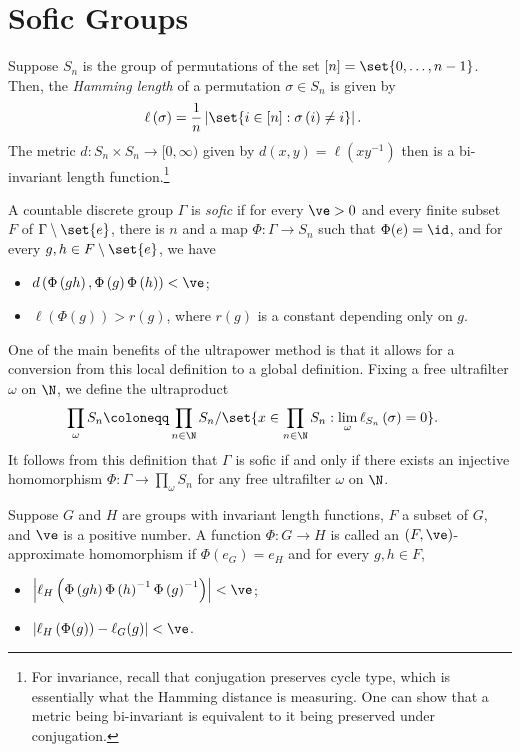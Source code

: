 \documentclass[10pt]{mypackage}
\renewcommand{\coloneq}{\coloneqq}
\begin{document}
\section{Sofic Groups}%
Suppose $S_n$ is the group of permutations of the set $[n] = \set{0,\dots,n-1}$. Then, the \textit{Hamming length} of a permutation $\sigma\in S_n$ is given by
\begin{align*}
  \ell \left( \sigma \right) &= \frac{1}{n}\left\vert \set{i\in [n] : \sigma\left( i \right)\neq i} \right\vert.
\end{align*}
The metric $d\colon S_n\times S_n\rightarrow [0,\infty)$ given by $d\left( x,y \right) = \ell\left( xy^{-1} \right)$ then is a bi-invariant length function.\footnote{For invariance, recall that conjugation preserves cycle type, which is essentially what the Hamming distance is measuring. One can show that a metric being bi-invariant is equivalent to it being preserved under conjugation.}
\begin{definition}
  A countable discrete group $\Gamma$ is \textit{sofic} if for every $\ve > 0$ and every finite subset $F$ of $\Gamma\setminus \set{e}$, there is $n$ and a map $\Phi\colon \Gamma\rightarrow S_n$ such that $\Phi(e) = \id$, and for every $g,h\in F\setminus \set{e}$, we have
  \begin{itemize}
    \item $d\left( \Phi\left( gh \right),\Phi\left( g \right)\Phi\left( h \right) \right) < \ve$;
    \item $\ell\left( \Phi\left( g \right) \right) > r(g)$, where $r(g)$ is a constant depending only on $g$.
  \end{itemize}
\end{definition}
One of the main benefits of the ultrapower method is that it allows for a conversion from this local definition to a global definition. Fixing a free ultrafilter $\omega$ on $\N$, we define the ultraproduct
\begin{align*}
  \prod_{\omega} S_n &\coloneq \prod_{n\in \N}S_n/\set{x\in \prod_{n\in \N}S_n : \lim_{\omega}\ell_{S_n}\left( \sigma \right) = 0}.
\end{align*}
It follows from this definition that $\Gamma$ is sofic if and only if there exists an injective homomorphism $\Phi\colon \Gamma\rightarrow \prod_{\omega}S_n$ for any free ultrafilter $\omega$ on $\N$.
\begin{definition}
  Suppose $G$ and $H$ are groups with invariant length functions, $F$ a subset of $G$, and $\ve$ is a positive number. A function $\Phi\colon G\rightarrow H$ is called an $\left( F,\ve \right)$-approximate homomorphism if $\Phi\left( e_G \right) = e_H$ and for every $g,h\in F$,
  \begin{itemize}
    \item $\left\vert \ell_H\left( \Phi\left( gh \right)\Phi\left( h \right)^{-1}\Phi\left( g \right)^{-1} \right) \right\vert < \ve$;
     \item $\left\vert \ell_H\left( \Phi(g) \right) - \ell_G(g) \right\vert < \ve$.
  \end{itemize}
\end{definition}
\end{document}
